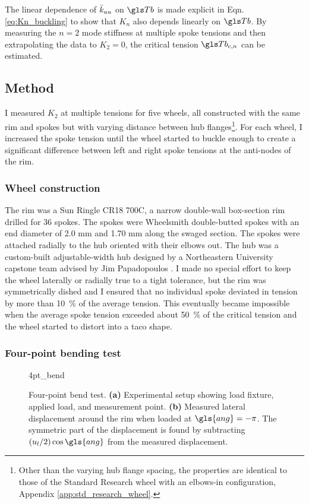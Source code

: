 \documentclass[\rootdir/thesis.tex]{subfiles}
\begin{document}
The linear dependence of $\bar{k}_{uu}$ on $\Tb$ is made explicit in Eqn. \eqref{eq:Kn_buckling} to show that $K_n$ also depends linearly on $\Tb$. By measuring the $n=2$ mode stiffness at multiple spoke tensions and then extrapolating the data to $K_2 = 0$, the critical tension $\Tb_{c,n}$ can be estimated.

\subsection{Method}

I measured $K_2$ at multiple tensions for five wheels, all constructed with the same rim and spokes but with varying distance between hub flanges\footnote{Other than the varying hub flange spacing, the properties are identical to those of the Standard Research wheel with an elbows-in configuration, Appendix \ref{app:std_research_wheel}.}. For each wheel, I increased the spoke tension until the wheel started to buckle enough to create a significant difference between left and right spoke tensions at the anti-nodes of the rim.

\subsubsection*{Wheel construction} The rim was a Sun Ringle CR18 700C, a narrow double-wall box-section rim drilled for 36 spokes. The spokes were Wheelsmith double-butted spokes with an end diameter of 2.0 mm and 1.70 mm along the swaged section. The spokes were attached radially to the hub oriented with their elbows out. The hub was a custom-built adjustable-width hub designed by a Northeastern University capstone team advised by Jim Papadopoulos \cite{Alim2016}. I made no special effort to keep the wheel laterally or radially true to a tight tolerance, but the rim was symmetrically dished and I ensured that no individual spoke deviated in tension by more than \SI{10}{\percent} of the average tension. This eventually became impossible when the average spoke tension exceeded about \SI{50}{\percent} of the critical tension and the wheel started to distort into a taco shape.

\subsubsection*{Four-point bending test}

\begin{figure}[t]
\centering
{4pt_bend}
\caption{Four-point bend test. \textbf{(a)} Experimental setup showing load fixture, applied load, and measurement point. \textbf{(b)} Measured lateral displacement around the rim when loaded at $\gls{ang}=-\pi$. The symmetric part of the displacement is found by subtracting $(u_l/2)\cos{\gls{ang}}$ from the measured displacement.}
\label{fig:4pt_bend_setup}
\end{figure}
\end{document}
